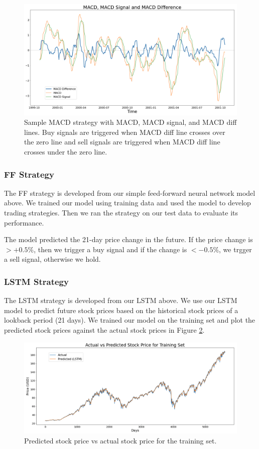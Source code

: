 \documentclass[10pt]{article}
\begin{document}
\begin{figure}[H]
\centering
\includegraphics[width=\textwidth]{macd}
\caption{Sample MACD strategy with MACD, MACD signal, and MACD diff lines. Buy signals are triggered when MACD diff line crosses over the zero line and sell signals are triggered when MACD diff line crosses under the zero line.}
\label{macd}
\end{figure}


\subsubsection{FF Strategy}

The FF strategy is developed from our simple feed-forward neural network model above. We trained our model using training data and used the model to develop trading strategies. Then we ran the strategy on our test data to evaluate its performance.

The model predicted the 21-day price change in the future. If the price change is $> +0.5\%$, then we trigger a buy signal and if the change is $< -0.5\%$, we trgger a sell signal, otherwise we hold.


\subsubsection{LSTM Strategy}

The LSTM strategy is developed from our LSTM above. We use our LSTM model to predict future stock prices based on the historical stock prices of a lookback period (21 days). We trained our model on the training set and plot the predicted stock prices against the actual stock prices in Figure \ref{lstmtrain}.

\begin{figure}[H]
\centering
\includegraphics[width=\textwidth]{lstm-train}
\caption{Predicted stock price vs actual stock price for the training set.}
\label{lstmtrain}
\end{figure}
\end{document}

